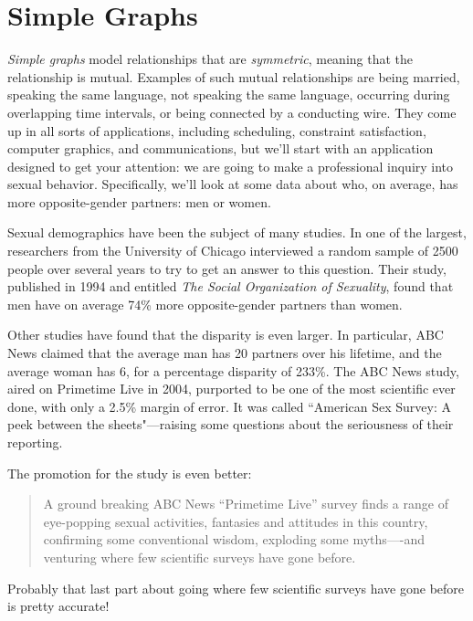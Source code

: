 \chapter{Simple Graphs}\label{simple_graphs_chap}

\emph{Simple graphs}%
model relationships that are \emph{symmetric},%
meaning that the relationship is mutual.
Examples of such mutual relationships are being married, speaking the
same language, not speaking the same language, occurring during
overlapping time intervals, or being connected by a conducting wire.
They come up in all sorts of applications, including scheduling,
constraint satisfaction, computer graphics, and communications, but
we'll start with an application designed to get your attention: we are
going to make a professional inquiry into sexual behavior.  Specifically,
we'll look at some data about who, on average, has more
opposite-gender partners: men or women.

\iffalse
An example is shown in
Figure~\ref{fig:graph-example}.  The dots are called \emph{nodes} (or
\emph{vertices}) and the lines are called \emph{edges}.
\fi

Sexual demographics have been the subject of many studies.  In one of
the largest, researchers from the University of Chicago
interviewed a random sample of 2500 people over several years to try
to get an answer to this question.  Their study, published in 1994 and
entitled \emph{The Social Organization of Sexuality}, found that men
have on average 74\% more opposite-gender partners than women.

Other studies have found that the disparity is even larger.  In
particular, ABC News claimed that the average man has 20 partners over
his lifetime, and the average woman has 6, for a percentage disparity
of 233\%.  The ABC News study, aired on Primetime Live in 2004,
purported to be one of the most scientific ever done, with only a
2.5\% margin of error.  It was called ``American Sex Survey: A peek
between the sheets"---raising some questions about the seriousness of
their reporting.
\begin{editingnotes}
The promotion for the study is even better:
\begin{quote} 
A ground breaking ABC News ``Primetime Live'' survey finds a range of
eye-popping sexual activities, fantasies and attitudes in this country,
confirming some conventional wisdom, exploding some myths----and venturing
where few scientific surveys have gone before.
\end{quote}
Probably that last part about going where few scientific surveys have gone
before is pretty accurate!
\end{editingnotes}

